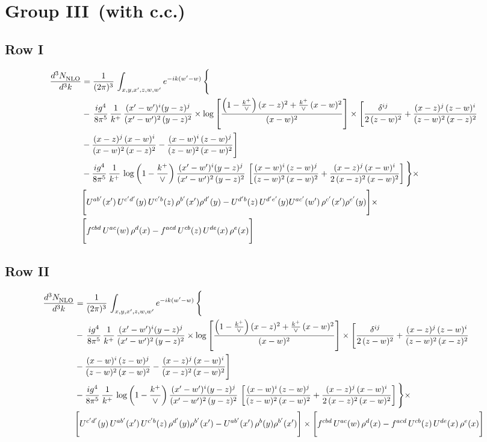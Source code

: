 \documentclass[9pt]{article}
\numberwithin{equation}{section}
\begin{document}
\section{Group III\, (with c.c.)}
\subsection{Row I}
\begin{align}
     \frac{d^{3}N_{\rm NLO}^{\rm}}{d^{3}k}  & =   \frac{1}{(2\pi)^{3}}\, \int_{x,y,x',z,w,w^{\prime}} e^{-ik(w^{\prime}-w)}\, \Bigg\{\notag \\
& -\,\frac{ig^{4}}{8\pi^{5}}\,\frac{1}{k^{+}}\,\frac{(x'-w')^{i}(y-z)^{j}}{(x'-w')^{2}\,(y-z)^{2}}\times \log{\left[\frac{\left(1-\frac{k^{+}}{\vee}\right)(x-z)^{2}+\frac{k^{+}}{\vee}\,(x-w)^{2}}{(x-w)^{2}}\right]}\times \Bigg[\frac{\delta^{ij}}{2\,(z-w)^{2}}+\frac{(x-z)^{j}\,(z-w)^{i}}{(z-w)^{2}\,(x-z)^{2}}\notag \\ & -\frac{(x-z)^{j}\,(x-w)^{i}}{(x-w)^{2}\,(x-z)^{2}}-\frac{(x-w)^{i}\,(z-w)^{j}}{(z-w)^{2}\,(x-w)^{2}}\Bigg] \notag \\
& -\frac{ig^{4}}{8\pi^{5}}\,\frac{1}{k^{+}}\,\log{\left(1-\frac{k^{+}}{\vee}\right)}\,\frac{(x'-w')^{i}(y-z)^{j}}{(x'-w')^{2}\,(y-z)^{2}}\,\left[\frac{(x-w)^{i}\,(z-w)^{j}}{(z-w)^{2}\,(x-w)^{2}}+\frac{(x-z)^{j}\,(x-w)^{i}}{2\,(x-z)^{2}\, (x-w)^{2}}\right]\Bigg\}\times \notag \\ &  \Bigg[U^{ab'}(x')\,U^{c'd'}(y)\,U^{c'b}(z)\,\rho^{b'}(x')\rho^{d'}(y)-U^{d'b}(z)\,U^{d'e'}(y)U^{ac'}(w')\,\rho^{c'}(x')\rho^{e'}(y)\Bigg]\times\notag \\ & \Bigg[f^{cbd}\,U^{ac}(w)\,\rho^{d}(x)-f^{acd}\, U^{cb}(z)\,U^{de}(x)\,\rho^{e}(x)\Bigg]
\end{align}
\subsection{Row II}
\begin{align}
     \frac{d^{3}N_{\rm NLO}^{\rm}}{d^{3}k}  & =   \frac{1}{(2\pi)^{3}}\, \int_{x,y,x',z,w,w^{\prime}} e^{-ik(w^{\prime}-w)}\, \Bigg\{\notag \\
& -\,\frac{ig^{4}}{8\pi^{5}}\,\frac{1}{k^{+}}\,\frac{(x'-w')^{i}(y-z)^{j}}{(x'-w')^{2}\,(y-z)^{2}}\times \log{\left[\frac{\left(1-\frac{k^{+}}{\vee}\right)(x-z)^{2}+\frac{k^{+}}{\vee}\,(x-w)^{2}}{(x-w)^{2}}\right]}\times \Bigg[\frac{\delta^{ij}}{2\,(z-w)^{2}}+\frac{(x-z)^{j}\,(z-w)^{i}}{(z-w)^{2}\,(x-z)^{2}}\notag \\ & -\frac{(x-w)^{i}\,(z-w)^{j}}{(z-w)^{2}\,(x-w)^{2}}-\frac{(x-z)^{j}\,(x-w)^{i}}{(x-z)^{2}\,(x-w)^{2}}\Bigg] \notag \\
& -\frac{ig^{4}}{8\pi^{5}}\,\frac{1}{k^{+}}\,\log{\left(1-\frac{k^{+}}{\vee}\right)}\,\frac{(x'-w')^{i}(y-z)^{j}}{(x'-w')^{2}\,(y-z)^{2}}\,\left[\frac{(x-w)^{i}\,(z-w)^{j}}{(z-w)^{2}\,(x-w)^{2}}+\frac{(x-z)^{j}\,(x-w)^{i}}{2\,(x-z)^{2}\, (x-w)^{2}}\right]\Bigg\}\times \notag \\ & \Bigg[U^{c'd'}(y)\,U^{ab'}(x')\,U^{c'b}(z)\,\rho^{d'}(y)\rho^{b'}(x')-U^{ab'}(x')\,\rho^{b}(y)\rho^{b'}(x')\Bigg]\times\Bigg[f^{cbd}\,U^{ac}(w)\,\rho^{d}(x)-f^{acd}\, U^{cb}(z)\,U^{de}(x)\,\rho^{e}(x)\Bigg]
\end{align}
\end{document}
